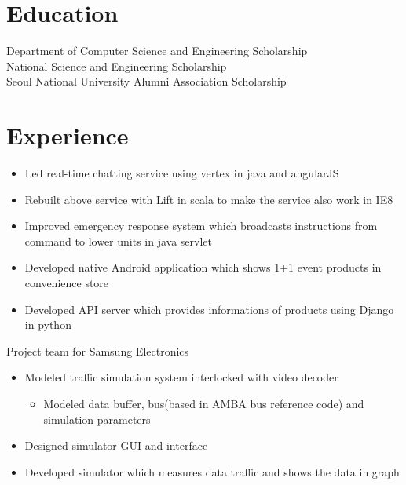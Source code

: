 \documentclass[11pt,a4paper,sans]{moderncv}        %
\begin{document}
\makecvtitle%
\vspace*{-10mm}

\section{Education}
{Department of Computer Science and Engineering Scholarship\\
National Science and Engineering Scholarship\\
Seoul National University Alumni Association Scholarship}

\section{Experience}
{\begin{itemize}%
    \item Led real-time chatting service using vertex in java and angularJS
    \item Rebuilt above service with Lift in scala to make the service also work in IE8
    \item Improved emergency response system which broadcasts instructions from command to lower units in java servlet 
\end{itemize}} 

{\begin{itemize}%
    \item Developed native Android application which shows 1+1 event products in convenience store
    \item Developed API server which provides informations of products using Django in python
\end{itemize}}

{Project team for Samsung Electronics
  \begin{itemize}%
    \item Modeled traffic simulation system interlocked with video decoder
      \begin{itemize}
        \item Modeled data buffer, bus(based in AMBA bus reference code) and simulation parameters
      \end{itemize}
    \item Designed simulator GUI and interface
    \item Developed simulator which measures data traffic and shows the data in graph
\end{itemize}}
\end{document}
